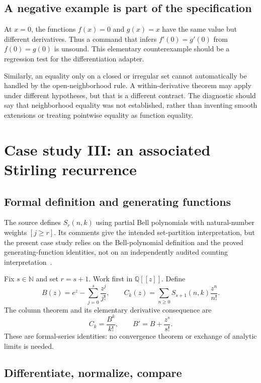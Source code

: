 \documentclass[11pt,a4paper]{article}
\newcommand{\N}{\mathbb N}
\newcommand{\Q}{\mathbb Q}
\theoremstyle{remark}
\begin{document}
\subsection{A negative example is part of the specification}

At $x=0$, the functions $f(x)=0$ and $g(x)=x$ have the same value but different derivatives. Thus a command that infers $f'(0)=g'(0)$ from $f(0)=g(0)$ is unsound. This elementary counterexample should be a regression test for the differentiation adapter.

Similarly, an equality only on a closed or irregular set cannot automatically be handled by the open-neighborhood rule. A within-derivative theorem may apply under different hypotheses, but that is a different contract. The diagnostic should say that neighborhood equality was not established, rather than inventing smooth extensions or treating pointwise equality as function equality.

\section{Case study III: an associated Stirling recurrence}
\label{sec:stirling}

\subsection{Formal definition and generating functions}

The source defines $S_r(n,k)$ using partial Bell polynomials with natural-number weights $[j\ge r]$. Its comments give the intended set-partition interpretation, but the present case study relies on the Bell-polynomial definition and the proved generating-function identities, not on an independently audited counting interpretation~\cite{proveit-stirling}.

Fix $s\in\N$ and set $r=s+1$. Work first in $\Q[[z]]$. Define
\[
B(z)=e^z-\sum_{j=0}^s\frac{z^j}{j!},
\qquad
C_k(z)=\sum_{n\ge0}S_{s+1}(n,k)\frac{z^n}{n!}.
\]
The column theorem and its elementary derivative consequence are
\begin{equation}
C_k=\frac{B^k}{k!},
\qquad
B'=B+\frac{z^s}{s!}.
\label{eq:stirling-columns}
\end{equation}
These are formal-series identities: no convergence theorem or exchange of analytic limits is needed.

\subsection{Differentiate, normalize, compare}
\end{document}
